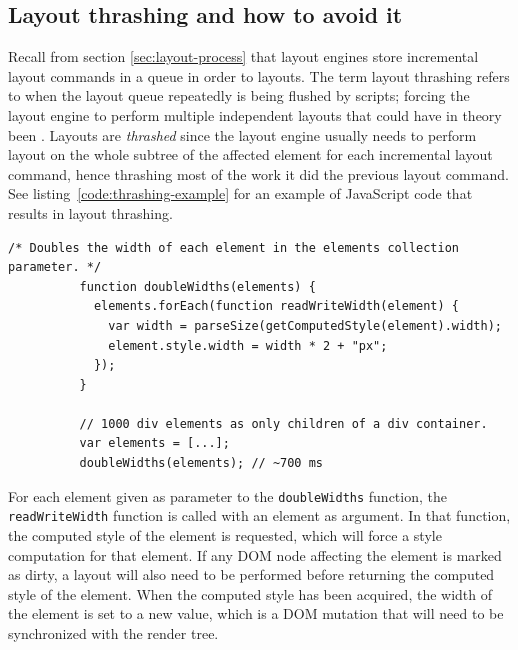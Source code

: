 \documentclass[a4paper,11pt]{kth-mag}
\newcommand{\code}[1]{\texttt{#1}}
\begin{document}
      \subsection{Layout thrashing and how to avoid it}\label{sec:layout-thrashing}
        Recall from section \ref{sec:layout-process} that \glspl{layout engine} store incremental layout commands in a queue in order to  layouts.
        The term \gls{layout thrashing} refers to when the layout queue repeatedly is being flushed by scripts; forcing the \gls{layout engine} to perform multiple independent layouts that could have in theory been .
        Layouts are \emph{thrashed} since the layout engine usually needs to perform layout on the whole subtree of the affected element for each incremental layout command, hence thrashing most of the work it did the previous layout command.
        See listing~\ref{code:thrashing-example} for an example of \gls{JavaScript} code that results in layout thrashing.
        \begin{lstlisting}[gobble=10,caption={Example of layout thrashing. The code reads and double the widths of 1000 \glspl{element} in \textasciitilde700 ms. The \code{parseSize} function is not important to understand the example.}, captionpos=b, label={code:thrashing-example}]
          /* Doubles the width of each element in the elements collection parameter. */
          function doubleWidths(elements) {
            elements.forEach(function readWriteWidth(element) {
              var width = parseSize(getComputedStyle(element).width);
              element.style.width = width * 2 + "px";
            });
          }

          // 1000 div elements as only children of a div container.
          var elements = [...];
          doubleWidths(elements); // ~700 ms
        \end{lstlisting}
        For each element given as parameter to the \code{doubleWidths} function, the \code{readWriteWidth} function is called with an element as argument.
        In that function, the computed style of the element is requested, which will force a style computation for that element.
        If any \gls{DOM} node affecting the element is marked as dirty, a layout will also need to be performed before returning the computed style of the element.
        When the computed style has been acquired, the width of the element is set to a new value, which is a \gls{DOM} mutation that will need to be synchronized with the render tree.
\end{document}
